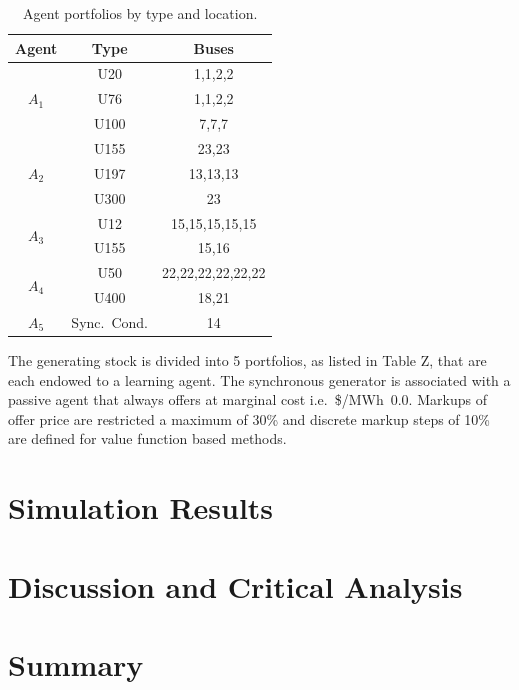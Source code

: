 \begin{table}
\begin{center}
\begin{tabular}{c|c|c}
\hline
Agent &Type &\multicolumn{1}{c}{Buses} \\
\hline\hline
\multirow{3}{*}{$A_1$} &U20 &1,1,2,2 \\
 & U76 &1,1,2,2 \\
 & U100 &7,7,7\\
\hline
\multirow{3}{*}{$A_2$} &U155 &23,23 \\
 & U197 &13,13,13 \\
 & U300 &23 \\
\hline
\multirow{2}{*}{$A_3$} &U12 &15,15,15,15,15 \\
 & U155 &15,16 \\
\hline
\multirow{2}{*}{$A_4$} &U50 &22,22,22,22,22,22 \\
 & U400 &18,21 \\
\hline
$A_5$ & Sync.~Cond. &14 \\
\hline
\end{tabular}
\caption{Agent portfolios by type and location.}
\label{tbl:agent_portfolios}
\end{center}
\end{table}

The generating stock is divided into 5 portfolios, as listed in Table Z, that
are each endowed to a learning agent.  The synchronous generator is associated
with a passive agent that always offers at marginal cost i.e.~\$/MWh~$0.0$.
Markups of offer price are restricted a maximum of 30\% and discrete markup
steps of 10\% are defined for value function based methods.

%

\section{Simulation Results}
\section{Discussion and Critical Analysis}
\label{sec:discuss}
\section{Summary}
